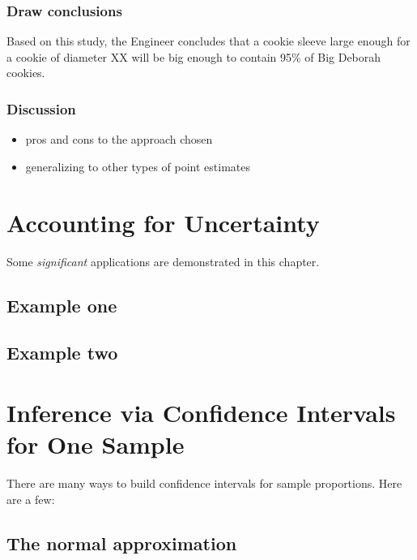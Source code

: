 \documentclass[
]{book}
\providecommand{\tightlist}{%
  \setlength{\itemsep}{0pt}\setlength{\parskip}{0pt}}
\theoremstyle{definition}
\theoremstyle{definition}
\theoremstyle{definition}
\theoremstyle{remark}
\begin{document}
\hypertarget{draw-conclusions}{%
\subsection{Draw conclusions}\label{draw-conclusions}}

Based on this study, the Engineer concludes that a cookie sleeve large enough for a cookie of diameter XX will be big enough to contain 95\% of Big Deborah cookies.

\hypertarget{discussion}{%
\subsection{Discussion}\label{discussion}}

\begin{itemize}
\tightlist
\item
  pros and cons to the approach chosen
\item
  generalizing to other types of point estimates
\end{itemize}

\hypertarget{accounting-for-uncertainty}{%
\chapter{Accounting for Uncertainty}\label{accounting-for-uncertainty}}

Some \emph{significant} applications are demonstrated in this chapter.

\hypertarget{example-one}{%
\section{Example one}\label{example-one}}

\hypertarget{example-two}{%
\section{Example two}\label{example-two}}

\hypertarget{CI}{%
\chapter{Inference via Confidence Intervals for One Sample}\label{CI}}

There are many ways to build confidence intervals for sample proportions. Here are a few:

\hypertarget{the-normal-approximation}{%
\section{The normal approximation}\label{the-normal-approximation}}
\end{document}
